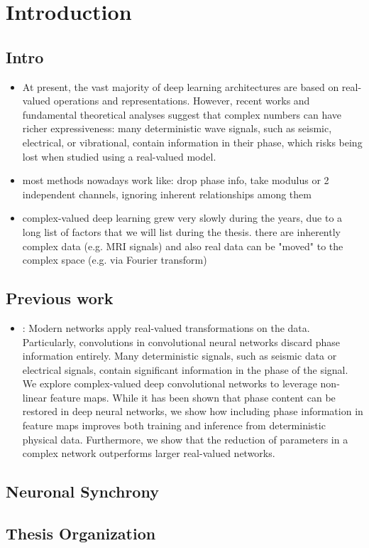 \documentclass[../main.tex]{subfiles}
\begin{document}
\chapter{Introduction}

\section{Intro}
\begin{itemize}
	\item At present, the vast majority of deep learning architectures are based on real-valued operations and representations. However, recent works and fundamental theoretical analyses suggest that complex numbers can have richer expressiveness: many deterministic wave signals, such as seismic, electrical, or vibrational, contain information in their phase, which risks being lost when studied using a real-valued model.
	\item most methods nowadays work like: drop phase info, take modulus or 2 independent channels, ignoring inherent relationships among them
	\item complex-valued deep learning grew very slowly during the years, due to a long list of factors that we will list during the thesis. there are inherently complex data (e.g. MRI signals) and also real data can be "moved" to the complex space (e.g. via Fourier transform)
\end{itemize}
\section{Previous work}
\begin{itemize}
	\item \cite{Dramsch_seismic}: Modern networks apply real-valued transformations on the
	data. Particularly, convolutions in convolutional neural networks discard phase
	information entirely. Many deterministic signals, such as seismic data or electrical
	signals, contain significant information in the phase of the signal. We explore
	complex-valued deep convolutional networks to leverage non-linear feature maps. While it has been shown that
	phase content can be restored in deep neural networks, we show how including
	phase information in feature maps improves both training and inference from
	deterministic physical data. Furthermore, we show that the reduction of parameters
	in a complex network outperforms larger real-valued networks.
\end{itemize}

\section{Neuronal Synchrony}
\section{Thesis Organization}
\end{document}
